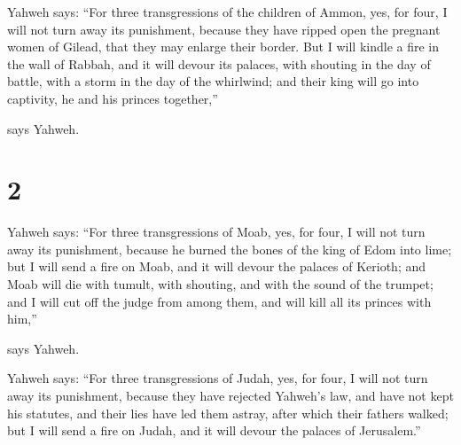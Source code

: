  Yahweh says: ``For three transgressions of the children
of Ammon, yes, for four, I will not turn away its punishment, because
they have ripped open the pregnant women of Gilead, that they may
enlarge their border.  But I will kindle a fire in the
wall of Rabbah, and it will devour its palaces, with shouting in the day
of battle, with a storm in the day of the whirlwind;  and
their king will go into captivity, he and his princes together,''

says Yahweh.

\hypertarget{section-1}{%
\section{2}\label{section-1}}

 Yahweh says: ``For three transgressions of Moab, yes, for
four, I will not turn away its punishment, because he burned the bones
of the king of Edom into lime;  but I will send a fire on
Moab, and it will devour the palaces of Kerioth; and Moab will die with
tumult, with shouting, and with the sound of the trumpet; 
and I will cut off the judge from among them, and will kill all its
princes with him,''

says Yahweh.

 Yahweh says: ``For three transgressions of Judah, yes,
for four, I will not turn away its punishment, because they have
rejected Yahweh's law, and have not kept his statutes, and their lies
have led them astray, after which their fathers walked; 
but I will send a fire on Judah, and it will devour the palaces of
Jerusalem.''

